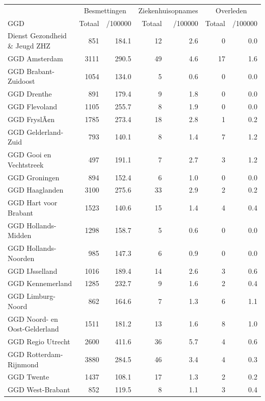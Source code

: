 \documentclass[
  english,
  man,floatsintext]{apa6}
\begin{document}
\begin{table}
\centering\begingroup\fontsize{10}{12}\selectfont

\begin{threeparttable}
\begin{tabular}{lrrrrrr}
\toprule
\multicolumn{1}{c}{ } & \multicolumn{2}{c}{Besmettingen} & \multicolumn{2}{c}{Ziekenhuisopnames} & \multicolumn{2}{c}{Overleden} \\
\cmidrule(l{3pt}r{3pt}){2-3} \cmidrule(l{3pt}r{3pt}){4-5} \cmidrule(l{3pt}r{3pt}){6-7}
GGD & Totaal & /100000 & Totaal & /100000 & Totaal & /100000\\
\midrule
Dienst Gezondheid \& Jeugd ZHZ & 851 & 184.1 & 12 & 2.6 & 0 & 0.0\\
GGD Amsterdam & 3111 & 290.5 & 49 & 4.6 & 17 & 1.6\\
GGD Brabant-Zuidoost & 1054 & 134.0 & 5 & 0.6 & 0 & 0.0\\
GGD Drenthe & 891 & 179.4 & 9 & 1.8 & 0 & 0.0\\
GGD Flevoland & 1105 & 255.7 & 8 & 1.9 & 0 & 0.0\\
GGD FryslÃ¢n & 1785 & 273.4 & 18 & 2.8 & 1 & 0.2\\
GGD Gelderland-Zuid & 793 & 140.1 & 8 & 1.4 & 7 & 1.2\\
GGD Gooi en Vechtstreek & 497 & 191.1 & 7 & 2.7 & 3 & 1.2\\
GGD Groningen & 894 & 152.4 & 6 & 1.0 & 0 & 0.0\\
GGD Haaglanden & 3100 & 275.6 & 33 & 2.9 & 2 & 0.2\\
GGD Hart voor Brabant & 1523 & 140.6 & 15 & 1.4 & 4 & 0.4\\
GGD Hollands-Midden & 1298 & 158.7 & 5 & 0.6 & 0 & 0.0\\
GGD Hollands-Noorden & 985 & 147.3 & 6 & 0.9 & 0 & 0.0\\
GGD IJsselland & 1016 & 189.4 & 14 & 2.6 & 3 & 0.6\\
GGD Kennemerland & 1285 & 232.7 & 9 & 1.6 & 2 & 0.4\\
GGD Limburg-Noord & 862 & 164.6 & 7 & 1.3 & 6 & 1.1\\
GGD Noord- en Oost-Gelderland & 1511 & 181.2 & 13 & 1.6 & 8 & 1.0\\
GGD Regio Utrecht & 2600 & 411.6 & 36 & 5.7 & 4 & 0.6\\
GGD Rotterdam-Rijnmond & 3880 & 284.5 & 46 & 3.4 & 4 & 0.3\\
GGD Twente & 1437 & 108.1 & 17 & 1.3 & 2 & 0.2\\
GGD West-Brabant & 852 & 119.5 & 8 & 1.1 & 3 & 0.4\\

\end{tabular}
\end{threeparttable}
\end{table}
\end{document}
